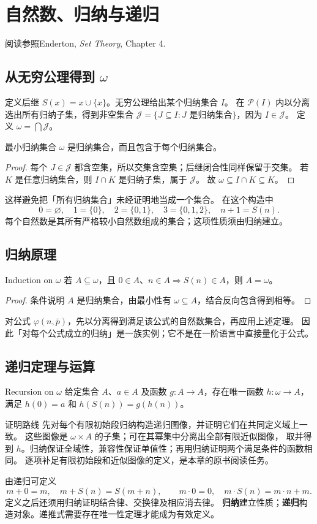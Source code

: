 \chapter{自然数、归纳与递归}
\begin{qlnote}{阅读参照}Enderton, \emph{Set Theory}, Chapter 4.\end{qlnote}

\section{从无穷公理得到 \texorpdfstring{\(\omega\)}{omega}}
定义后继 \(S(x)=x\cup\{x\}\)。无穷公理给出某个归纳集合 \(I\)。
在 \(\mathcal P(I)\) 内以分离选出所有归纳子集，得到非空集合
\(\mathcal J=\{J\subseteq I:J\text{ 是归纳集合}\}\)，因为 \(I\in\mathcal J\)。
定义 \(\omega=\bigcap\mathcal J\)。

\begin{theorem}{最小归纳集合}
\(\omega\) 是归纳集合，而且包含于每个归纳集合。
\end{theorem}
\begin{proof}
每个 \(J\in\mathcal J\) 都含空集，所以交集含空集；后继闭合性同样保留于交集。
若 \(K\) 是任意归纳集合，则 \(I\cap K\) 是归纳子集，属于 \(\mathcal J\)。
故 \(\omega\subseteq I\cap K\subseteq K\)。
\end{proof}
这样避免把「所有归纳集合」未经证明地当成一个集合。
在这个构造中
\[
 0=\varnothing,\quad 1=\{0\},\quad 2=\{0,1\},\quad 3=\{0,1,2\},\quad n+1=S(n).
\]
每个自然数是其所有严格较小自然数组成的集合；这项性质须由归纳建立。

\section{归纳原理}
\begin{theorem}{Induction on \texorpdfstring{\(\omega\)}{omega}}
若 \(A\subseteq\omega\)，且 \(0\in A\)、\(n\in A\Rightarrow S(n)\in A\)，则 \(A=\omega\)。
\end{theorem}
\begin{proof}
条件说明 \(A\) 是归纳集合，由最小性有 \(\omega\subseteq A\)，结合反向包含得到相等。
\end{proof}
对公式 \(\varphi(n,\bar p)\)，先以分离得到满足该公式的自然数集合，再应用上述定理。
因此「对每个公式成立的归纳」是一族实例；它不是在一阶语言中直接量化于公式。

\section{递归定理与运算}
\begin{theorem}{Recursion on \texorpdfstring{\(\omega\)}{omega}}
给定集合 \(A\)、\(a\in A\) 及函数 \(g:A\to A\)，存在唯一函数 \(h:\omega\to A\)，满足
\(h(0)=a\) 和 \(h(S(n))=g(h(n))\)。
\end{theorem}
\begin{qlnote}{证明路线}
先对每个有限初始段归纳构造递归图像，并证明它们在共同定义域上一致。
这些图像是 \(\omega\times A\) 的子集；可在其幂集中分离出全部有限近似图像，
取并得到 \(h\)。归纳保证全域性，兼容性保证单值性；再用归纳证明两个满足条件的函数相同。
逐项补足有限初始段和近似图像的定义，是本章的原书阅读任务。
\end{qlnote}

由递归可定义
\[
 m+0=m,\quad m+S(n)=S(m+n),\qquad
 m\cdot0=0,\quad m\cdot S(n)=m\cdot n+m.
\]
定义之后还须用归纳证明结合律、交换律及相应消去律。
\textbf{归纳}建立性质；\textbf{递归}构造对象。递推式需要存在唯一性定理才能成为有效定义。
